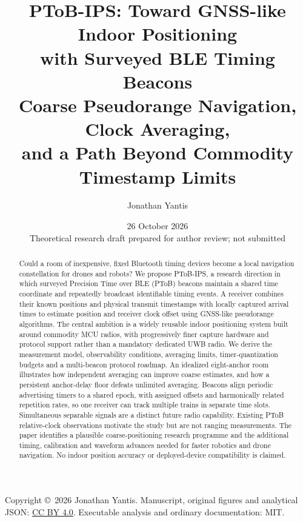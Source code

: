 \documentclass[11pt,letterpaper]{article}
\begin{document}
\title{\vspace{-1.3em}PToB-IPS: Toward GNSS-like Indoor Positioning\\with Surveyed BLE Timing Beacons\\[5pt]\large Coarse Pseudorange Navigation, Clock Averaging,\\and a Path Beyond Commodity Timestamp Limits}
\author{Jonathan Yantis}
\date{26 October 2026\\\small Theoretical research draft prepared for author review; not submitted}
\maketitle
\begin{abstract}
Could a room of inexpensive, fixed Bluetooth timing devices become a local navigation constellation for drones and robots? We propose PToB-IPS, a research direction in which surveyed Precision Time over BLE (PToB) beacons maintain a shared time coordinate and repeatedly broadcast identifiable timing events. A receiver combines their known positions and physical transmit timestamps with locally captured arrival times to estimate position and receiver clock offset using GNSS-like pseudorange algorithms. The central ambition is a widely reusable indoor positioning system built around commodity MCU radios, with progressively finer capture hardware and protocol support rather than a mandatory dedicated UWB radio. We derive the measurement model, observability conditions, averaging limits, timer-quantization budgets and a multi-beacon protocol roadmap. An idealized eight-anchor room illustrates how independent averaging can improve coarse estimates, and how a persistent anchor-delay floor defeats unlimited averaging. Beacons align periodic advertising timers to a shared epoch, with assigned offsets and harmonically related repetition rates, so one receiver can track multiple trains in separate time slots. Simultaneous separable signals are a distinct future radio capability. Existing PToB relative-clock observations motivate the study but are not ranging measurements. The paper identifies a plausible coarse-positioning research programme and the additional timing, calibration and waveform advances needed for faster robotics and drone navigation. No indoor position accuracy or deployed-device compatibility is claimed.
\end{abstract}
\noindent\small Copyright \copyright\ 2026 Jonathan Yantis. Manuscript, original figures and analytical JSON: \href{https://creativecommons.org/licenses/by/4.0/}{CC BY 4.0}. Executable analysis and ordinary documentation: MIT.\normalsize
\end{document}
